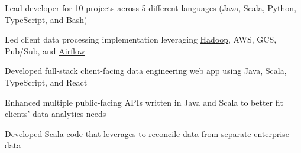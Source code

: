 \vspace{\headerAntispace}
\begin{compactitem}
        \begin{compactitem}
            \iftoggle{productfocus}{%
                \item Operated without dedicated Product Managers or Designers, owning scope definition and product
                      decisions
                \item Championed Claude Code over Gemini for team adoption; trained colleagues on Cursor and AGENT files
                \item Led end-to-end cloud integration across GCS, AWS, and Airflow, avoiding burdening on-prem servers
                \item Proactively implemented Google Airflow pipeline ahead of formal requirements, unblocking
                      onboarding
                \item Led 24-hour production deployment for a major client, coordinating cross-functional teams
                \item Established release branching policy across all 5 team projects, improving delivery predictability
                \item Revived monthly Tech Brownbag series to rebuild cross-team knowledge sharing after a multi-year
                      gap
                \item Built native macOS menu bar app for real-time visibility into long-running jobs in production
            }{}
            \item Lead developer for 10 projects across 5 different languages (Java, Scala, Python, TypeScript, and
                  Bash)
            \item Led client data processing implementation leveraging \href{https://hadoop.apache.org/}{Hadoop},
                  AWS, GCS, Pub/Sub, and \href{https://airflow.apache.org/}{Airflow}
            \item Developed full-stack client-facing data engineering web app using Java, Scala, TypeScript, and React
            \item Enhanced multiple public-facing APIs written in Java and Scala to better fit clients' data analytics
                  needs
            \item Developed Scala code that leverages \Elasticsearch{} to reconcile data from separate enterprise data

\end{compactitem}
\end{compactitem}
